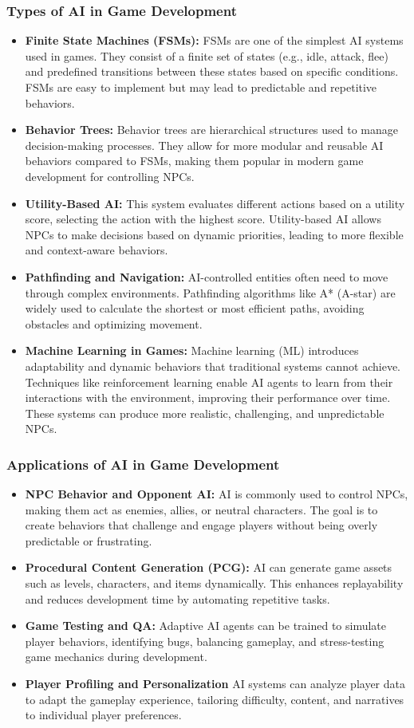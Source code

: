 \documentclass[12pt,oneside,openright,a4paper]{cpe-english-project}
\begin{document}
\subsubsection{Types of AI in Game Development}
\begin{itemize}
\item  \textbf{Finite State Machines (FSMs):}
FSMs are one of the simplest AI systems used in games. They consist of a finite set of states (e.g., idle, attack, flee) and predefined transitions between these states based on specific conditions. FSMs are easy to implement but may lead to predictable and repetitive behaviors.
\item  \textbf{Behavior Trees:}
Behavior trees are hierarchical structures used to manage decision-making processes. They allow for more modular and reusable AI behaviors compared to FSMs, making them popular in modern game development for controlling NPCs.
\item  \textbf{Utility-Based AI:}
This system evaluates different actions based on a utility score, selecting the action with the highest score. Utility-based AI allows NPCs to make decisions based on dynamic priorities, leading to more flexible and context-aware behaviors.
\item  \textbf{Pathfinding and Navigation:}
AI-controlled entities often need to move through complex environments. Pathfinding algorithms like A* (A-star) are widely used to calculate the shortest or most efficient paths, avoiding obstacles and optimizing movement.
\item  \textbf{Machine Learning in Games:}
Machine learning (ML) introduces adaptability and dynamic behaviors that traditional systems cannot achieve. Techniques like reinforcement learning enable AI agents to learn from their interactions with the environment, improving their performance over time. These systems can produce more realistic, challenging, and unpredictable NPCs.
\end{itemize}
\subsubsection{Applications of AI in Game Development}
\begin{itemize}
\item  \textbf{NPC Behavior and Opponent AI:}
AI is commonly used to control NPCs, making them act as enemies, allies, or neutral characters. The goal is to create behaviors that challenge and engage players without being overly predictable or frustrating.
\item  \textbf{Procedural Content Generation (PCG):}
AI can generate game assets such as levels, characters, and items dynamically. This enhances replayability and reduces development time by automating repetitive tasks.
\item  \textbf{Game Testing and QA:}
Adaptive AI agents can be trained to simulate player behaviors, identifying bugs, balancing gameplay, and stress-testing game mechanics during development.
\item  \textbf{Player Profiling and Personalization}
AI systems can analyze player data to adapt the gameplay experience, tailoring difficulty, content, and narratives to individual player preferences.
\end{itemize}
\end{document}
